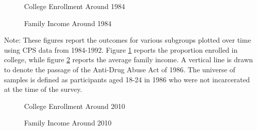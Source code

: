 
\begin{figure}[h]
    \centering
    \caption{College Enrollment Around 1984}%
    \qquad
    \label{fig:raw_college_1986}%
  \end{figure}
  
  \begin{figure}[h]
    \centering
    \caption{Family Income Around 1984}%
    \qquad
    \label{fig:raw_faminc_1986}%
  \end{figure}
  
  \begin{footnotesize}
    \noindent Note: These figures report the outcomes for various subgroups plotted over time using CPS data from 1984-1992. Figure \ref{fig:raw_college_1986} reports the proportion enrolled in college, while figure \ref{fig:raw_faminc_1986} reports the average family income. A vertical line is drawn to denote the passage of the Anti-Drug Abuse Act of 1986. The universe of samples is defined as participants aged 18-24 in 1986 who were not incarcerated at the time of the survey.
  \end{footnotesize}
  
  \clearpage
  
  
  \begin{figure}[h]
    \centering
    \caption{College Enrollment Around 2010}%
    \qquad
    \label{fig:raw_college_2010}%
  \end{figure}
  
  \begin{figure}[h]
    \centering
    \caption{Family Income Around 2010}%
    \qquad
    \label{fig:raw_faminc_2010}%
  \end{figure}
  
